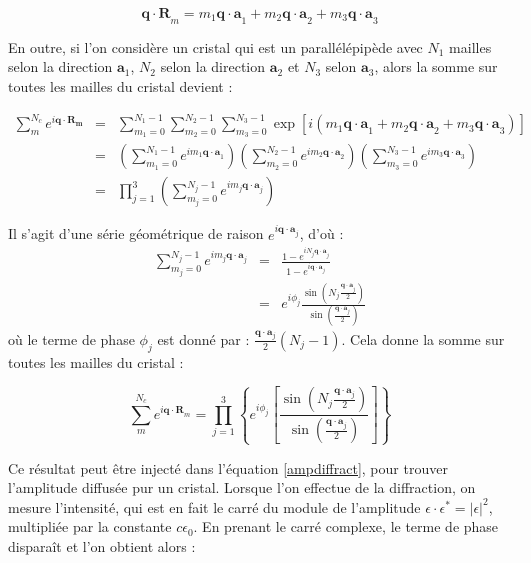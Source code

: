 \begin{equation}
    \mathbf{q\cdot R}_m = m_1 \mathbf{q \cdot a}_1 + m_2 \mathbf{q \cdot a}_2 + m_3 \mathbf{q \cdot a}_3
\end{equation}

En outre, si l'on considère un cristal qui est un parallélépipède avec $N_1$
mailles selon la direction $\mathbf{a}_1$, $N_2$ selon la direction $\mathbf{a}_2$
et $N_3$ selon $\mathbf{a}_3$, alors la somme sur toutes les mailles du cristal
devient :

\begin{eqnarray}
    \sum_m^{N_c} e^{i \mathbf{q\cdot R_m}} & = &
        \sum_{m_1 = 0}^{N_1 - 1} \sum_{m_2 = 0}^{N_2 - 1} \sum_{m_3 = 0}^{N_3 - 1}
        \exp [i(m_1 \mathbf{q \cdot a}_1 + m_2 \mathbf{q \cdot a}_2 + m_3 \mathbf{q \cdot a}_3)]\\
        & = & \left( \sum_{m_1 = 0}^{N_1 - 1} e^{i m_1 \mathbf{q\cdot a}_1} \right) 
        \left( \sum_{m_2 = 0}^{N_2-1} e^{i m_2 \mathbf{q\cdot a}_2} \right)
        \left( \sum_{m_3 = 0}^{N_3-1} e^{i m_3 \mathbf{q\cdot a}_3} \right)\\
        & = & \prod_{j=1}^3 \left( \sum_{m_j = 0}^{N_j -1} e^{i m_j \mathbf{q\cdot a}_j} \right)
    \end{eqnarray}

Il s'agit d'une série géométrique de raison $e^{i \mathbf{q\cdot a}_j}$, d'où :
\begin{eqnarray}
    \sum_{m_j = 0}^{N_j - 1} e^{i m_j \mathbf{q\cdot a}_j} & = &
    \frac{1 - e^{i N_j \mathbf{q\cdot a}_j}}{1 - e^{i \mathbf{q \cdot a}_j}} \\
    & = & e^{i \phi_j} \frac{\sin \left( N_j \frac{\mathbf{q\cdot a}_j}{2} \right) }{\sin \left( \frac{\mathbf{q\cdot a}_j}{2} \right)}
\end{eqnarray}
où le terme de phase $\phi_j$ est donné par : $\frac{\mathbf{q\cdot a}_j}{2} (N_j
-1)$. Cela donne la somme sur toutes les mailles du cristal :

\begin{equation}
    \sum_m^{N_c} e^{i\mathbf{q\cdot R}_m} = \prod_{j=1}^3 \left\{ e^{i\phi_j} \left[ \frac{\sin \left(N_j \frac{\mathbf{q\cdot a}_j}{2}
    \right)}{\sin \left(\frac{\mathbf{q\cdot a}_j}{2} \right)} \right] \right\}
    \label{sommecristal}
\end{equation}

Ce résultat peut être injecté dans l'équation \ref{ampdiffract}, pour trouver
l'amplitude diffusée pur un cristal. Lorsque l'on effectue de la diffraction, on
mesure l'intensité, qui est en fait le carré du module de l'amplitude
$\epsilon \cdot \epsilon^* = |\epsilon|^2$, multipliée par la constante
$c\epsilon_0$. En prenant le carré complexe, le terme de phase disparaît et l'on
obtient alors :

